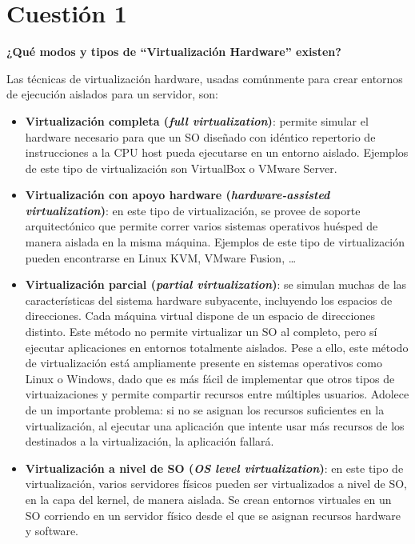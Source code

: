 \documentclass[a4paper,11pt]{article}
\newenvironment{answer}{%
\begin{list}{}{%
\addtolength{\hoffset}{0cm}
}%
\item[]}{\end{list}}
\newcommand{\imagent}[4]{
  \begin{figure}
    \begin{center}
    \texttt{[image: \#1]}
    \end{center}
    \caption{#3}
    \label{#4}
  \end{figure}
}
\newcommand{\imagen}[3]{
  \begin{figure}[here]
    \begin{center}
    \texttt{[image: \#1]}
    \end{center}
    \caption{#2}
    \label{#3}
  \end{figure}
}
\begin{document}
\newpage
\tableofcontents
\newpage

\section{Cuestión 1}
\textbf{¿Qué modos y tipos de “Virtualización Hardware” existen?}
\begin{answer}
 Las técnicas de virtualización hardware, usadas comúnmente para crear entornos de ejecución aislados para un 
 servidor, son:
 \begin{itemize}
  \item \textbf{Virtualización completa (\textit{full virtualization})}: permite simular el hardware necesario
  para que un SO diseñado con idéntico repertorio de instrucciones a la CPU host pueda ejecutarse en un entorno
  aislado. Ejemplos de este tipo de virtualización son VirtualBox o VMware Server.
  \item \textbf{Virtualización con apoyo hardware (\textit{hardware-assisted virtualization})}: en este tipo
  de virtualización, se provee de soporte arquitectónico que permite correr varios sistemas operativos 
  huésped de manera aislada en la misma máquina. Ejemplos de este tipo de virtualización pueden encontrarse
  en Linux KVM, VMware Fusion, \ldots
  \item \textbf{Virtualización parcial (\textit{partial virtualization})}: se simulan muchas de las características
  del sistema hardware subyacente, incluyendo los espacios de direcciones. Cada máquina virtual dispone de un
  espacio de direcciones distinto. Este método no permite virtualizar un SO al completo, pero sí ejecutar
  aplicaciones en entornos totalmente aislados. Pese a ello, este método de virtualización está ampliamente
  presente en sistemas operativos como Linux o Windows, dado que es más fácil de implementar que otros
  tipos de virtuaizaciones y permite compartir recursos entre múltiples usuarios. Adolece de un importante problema:
  si no se asignan los recursos suficientes en la virtualización, al ejecutar una aplicación que intente
  usar más recursos de los destinados a la virtualización, la aplicación fallará.
  \item \textbf{Virtualización a nivel de SO (\textit{OS level virtualization})}: en este tipo de virtualización,
  varios servidores físicos pueden ser virtualizados a nivel de SO, en la capa del kernel, de manera aislada. 
  Se crean entornos virtuales en un SO corriendo en un servidor físico desde el que se asignan recursos hardware y software.\\

\end{itemize}
\end{answer}
\end{document}
